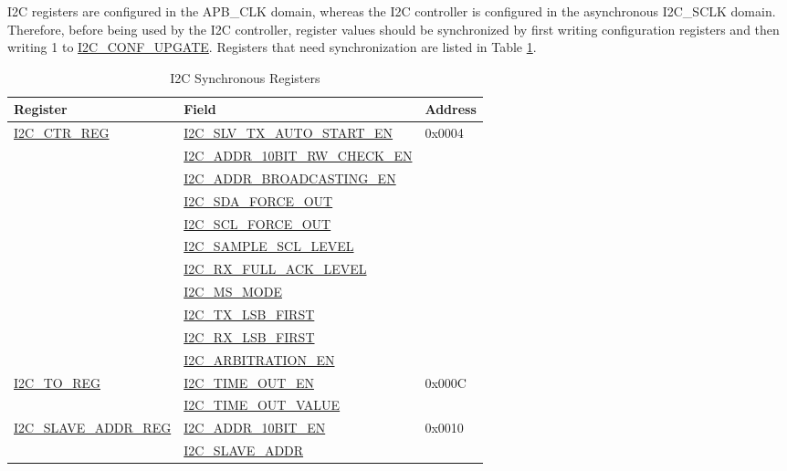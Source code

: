 \documentclass[main\_\_EN.tex]{subfiles}
\begin{document}
I2C registers are configured in the APB\_CLK domain, whereas the I2C controller is configured in the asynchronous I2C\_SCLK domain. Therefore, before being used by the I2C controller, register values should be synchronized by first writing configuration registers and then writing 1 to \hyperref[fielddesc:I2CCONFUPGATE]{I2C\_CONF\_UPGATE}. Registers that need synchronization are listed in Table \ref{tab:i2c-sync-register}.
\newpage
\begin{longtable}{ | p{6cm} | p{7cm} | p{2cm} | }
\caption{I2C Synchronous Registers}
\label{tab:i2c-sync-register}
\\\hline
\rowcolor{lightgray}
Register & Field & Address  \\ \hline
\hyperref[regdesc:I2CCTRREG]{I2C\_CTR\_REG} & {\hyperref[fielddesc:I2CSLVTXAUTOSTARTEN]{I2C\_SLV\_TX\_AUTO\_START\_EN}} & 0x0004  \\\cline{2-2}
& {\hyperref[fielddesc:I2CADDR10BITRWCHECKEN]{I2C\_ADDR\_10BIT\_RW\_CHECK\_EN}}& \\\cline{2-2}
& {\hyperref[fielddesc:I2CADDRBROADCASTINGEN]{I2C\_ADDR\_BROADCASTING\_EN}}& \\\cline{2-2}
& {\hyperref[fielddesc:I2CSDAFORCEOUT]{I2C\_SDA\_FORCE\_OUT}}& \\\cline{2-2}
& {\hyperref[fielddesc:I2CSCLFORCEOUT]{I2C\_SCL\_FORCE\_OUT}}& \\\cline{2-2}
& {\hyperref[fielddesc:I2CSAMPLESCLLEVEL]{I2C\_SAMPLE\_SCL\_LEVEL}}& \\\cline{2-2}
& {\hyperref[fielddesc:I2CRXFULLACKLEVEL]{I2C\_RX\_FULL\_ACK\_LEVEL}}& \\\cline{2-2}
& {\hyperref[fielddesc:I2CMSMODE]{I2C\_MS\_MODE}}& \\\cline{2-2}
& {\hyperref[fielddesc:I2CTXLSBFIRST]{I2C\_TX\_LSB\_FIRST}}& \\\cline{2-2}
& {\hyperref[fielddesc:I2CRXLSBFIRST]{I2C\_RX\_LSB\_FIRST}}& \\\cline{2-2}
& {\hyperref[fielddesc:I2CARBITRATIONEN]{I2C\_ARBITRATION\_EN}}& \\ \hline
\hyperref[regdesc:I2CTOREG]{I2C\_TO\_REG} & {\hyperref[fielddesc:I2CTIMEOUTEN]{I2C\_TIME\_OUT\_EN}} & 0x000C  \\\cline{2-2}
& {\hyperref[fielddesc:I2CTIMEOUTVALUE]{I2C\_TIME\_OUT\_VALUE}}& \\ \hline
\hyperref[regdesc:I2CSLAVEADDRREG]{I2C\_SLAVE\_ADDR\_REG} & {\hyperref[fielddesc:I2CADDR10BITEN]{I2C\_ADDR\_10BIT\_EN}} & 0x0010 \\\cline{2-2}
& {\hyperref[fielddesc:I2CSLAVEADDR]{I2C\_SLAVE\_ADDR}}& \\ \hline

\end{longtable}
\end{document}
